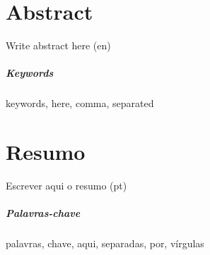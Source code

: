 \chapter*{Abstract}

Write abstract here (en)

\paragraph{Keywords} keywords, here, comma, separated

\cleardoublepage

\chapter*{Resumo}

Escrever aqui o resumo (pt)

\paragraph{Palavras-chave} palavras, chave, aqui, separadas, por, vírgulas

\cleardoublepage
